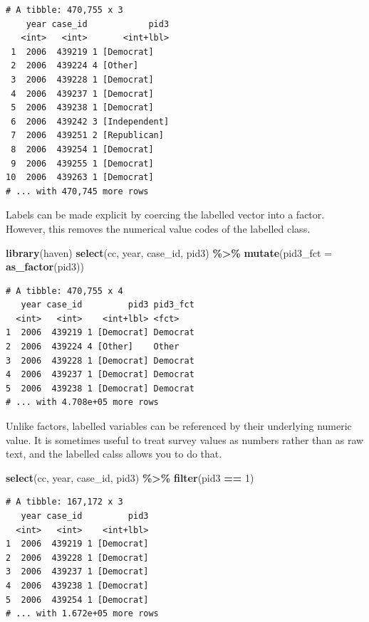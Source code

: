 \documentclass[10pt,article,oneside]{memoir}
\theoremstyle{definition}
\newenvironment{Shaded}{\begin{snugshade}}{\end{snugshade}}
\newcommand{\DataTypeTok}[1]{\textcolor[rgb]{0.13,0.29,0.53}{#1}}
\newcommand{\DecValTok}[1]{\textcolor[rgb]{0.00,0.00,0.81}{#1}}
\newcommand{\KeywordTok}[1]{\textcolor[rgb]{0.13,0.29,0.53}{\textbf{#1}}}
\newcommand{\NormalTok}[1]{#1}
\newcommand{\OperatorTok}[1]{\textcolor[rgb]{0.81,0.36,0.00}{\textbf{#1}}}
\newcommand{\StringTok}[1]{\textcolor[rgb]{0.31,0.60,0.02}{#1}}
\begin{document}
\begin{verbatim}
# A tibble: 470,755 x 3
    year case_id            pid3
   <int>   <int>       <int+lbl>
 1  2006  439219 1 [Democrat]   
 2  2006  439224 4 [Other]      
 3  2006  439228 1 [Democrat]   
 4  2006  439237 1 [Democrat]   
 5  2006  439238 1 [Democrat]   
 6  2006  439242 3 [Independent]
 7  2006  439251 2 [Republican] 
 8  2006  439254 1 [Democrat]   
 9  2006  439255 1 [Democrat]   
10  2006  439263 1 [Democrat]   
# ... with 470,745 more rows
\end{verbatim}

\noindent Labels can be made explicit by coercing the labelled vector
into a factor. However, this removes the numerical value codes of the
labelled class.

\begin{Shaded}
\begin{Highlighting}[]
\KeywordTok{library}\NormalTok{(haven)}
\KeywordTok{select}\NormalTok{(cc, year, case\_id, pid3) }\OperatorTok{\%>\%}\StringTok{ }
\StringTok{  }\KeywordTok{mutate}\NormalTok{(}\DataTypeTok{pid3\_fct =} \KeywordTok{as\_factor}\NormalTok{(pid3))}
\end{Highlighting}
\end{Shaded}

\begin{verbatim}
# A tibble: 470,755 x 4
   year case_id         pid3 pid3_fct
  <int>   <int>    <int+lbl> <fct>   
1  2006  439219 1 [Democrat] Democrat
2  2006  439224 4 [Other]    Other   
3  2006  439228 1 [Democrat] Democrat
4  2006  439237 1 [Democrat] Democrat
5  2006  439238 1 [Democrat] Democrat
# ... with 4.708e+05 more rows
\end{verbatim}

\noindent Unlike factors, labelled variables can be referenced by their
underlying numeric value. It is sometimes useful to treat survey values
as numbers rather than as raw text, and the labelled calss allows you to
do that.

\begin{Shaded}
\begin{Highlighting}[]
\KeywordTok{select}\NormalTok{(cc, year, case\_id, pid3) }\OperatorTok{\%>\%}\StringTok{ }
\StringTok{  }\KeywordTok{filter}\NormalTok{(pid3 }\OperatorTok{==}\StringTok{ }\DecValTok{1}\NormalTok{)}
\end{Highlighting}
\end{Shaded}

\begin{verbatim}
# A tibble: 167,172 x 3
   year case_id         pid3
  <int>   <int>    <int+lbl>
1  2006  439219 1 [Democrat]
2  2006  439228 1 [Democrat]
3  2006  439237 1 [Democrat]
4  2006  439238 1 [Democrat]
5  2006  439254 1 [Democrat]
# ... with 1.672e+05 more rows
\end{verbatim}
\end{document}

